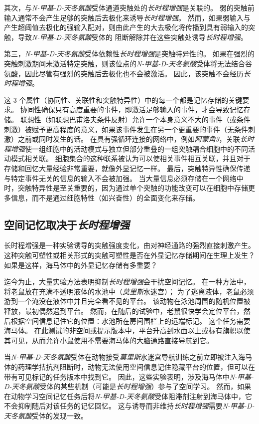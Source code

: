 其次，与\textit{N-甲基-D-天冬氨酸}受体通道突触处的\textit{长时程增强}是关联的。
弱的突触前输入通常不会产生足够的突触后去极化来诱导\textit{长时程增强}。
然而，如果弱输入与产生超阈值去极化的强输入配对，则由此产生的大去极化将传播到具有弱输入的突触，导致\textit{N-甲基-D-天冬氨酸}受体的  阻断解除并在这些突触处诱导\textit{长时程增强}。


第三，\textit{N-甲基-D-天冬氨酸}受体依赖性\textit{长时程增强}是突触特异性的。
如果在强烈的突触刺激期间未激活特定突触，则该位点的\textit{N-甲基-D-天冬氨酸}受体将无法结合谷氨酸，因此尽管有强烈的突触后去极化也不会被激活。
因此，该突触不会经历\textit{长时程增强}。


这 3 个属性（协同性、关联性和突触特异性）中的每一个都是记忆存储的关键要求。
协同性确保只有高度重要的事件，即激活足够输入的事件，才会导致记忆存储。
联想性（如联想巴甫洛夫条件反射）允许一个本身意义不大的事件（或条件刺激）被赋予更高程度的意义，如果该事件发生在另一个更重要的事件（无条件刺激）之前或同时发生的话。
在具有强循环连接的网络中，例如\textit{阿蒙角3}，关联\textit{长时程增强}使一组细胞中的活动模式与独立但部分重叠的一组突触耦合细胞中的不同活动模式相关联。
细胞集合的这种联系被认为可以使相关事件相互关联，并且对于存储和回忆大量经验非常重要，就像外显记忆一样。
最后，突触特异性确保传递与特定事件无关的信息的输入不会被加强。
当大量信息必须存储在一个网络中时，突触特异性是至关重要的，因为通过单个突触的功能改变可以在细胞中存储更多信息，而不是通过细胞特性（如兴奋性）的全面变化来存储。



\subsection{空间记忆取决于\textit{长时程增强}}

长时程增强是一种实验诱导的突触强度变化，由对神经通路的强烈直接刺激产生。
这种突触可塑性或相关形式的突触可塑性是否在外显记忆存储期间在生理上发生？
如果是这样，海马体中的外显记忆存储有多重要？


迄今为止，大量实验方法表明抑制\textit{长时程增强}会干扰空间记忆。
在一种方法中，将老鼠放在充满不透明液体的水池中（\textit{莫里斯}水迷宫）；
为了逃离液体，老鼠必须游到一个淹没在液体中并且完全看不见的平台。
该动物在泳池周围的随机位置被释放，最初偶然遇到平台。
然而，在随后的试验中，老鼠很快学会定位平台，然后根据空间信息记住它的位置：水池所在房间围栏上的远端标记。
这个任务需要海马体。
在此测试的非空间或提示版本中，平台升高到水面以上或标有旗帜以使其可见，从而允许小鼠使用不需要海马体的大脑通路直接导航到它。


当\textit{N-甲基-D-天冬氨酸}受体在动物接受\textit{莫里斯}水迷宫导航训练之前立即被注入海马体的药理学拮抗剂阻断时，动物无法使用空间信息记住隐藏平台的位置，但可以在带有可见标记的任务版本中找到它。
因此，这些实验表明，涉及海马体中\textit{N-甲基-D-天冬氨酸}受体的某些机制（可能是\textit{长时程增强}）参与了空间学习。
然而，如果在动物学习空间记忆任务后将\textit{N-甲基-D-天冬氨酸}受体阻滞剂注射到海马体中，它不会抑制随后对该任务的记忆回忆。
这与诱导而非维持\textit{长时程增强}需要\textit{N-甲基-D-天冬氨酸}受体的发现一致。



